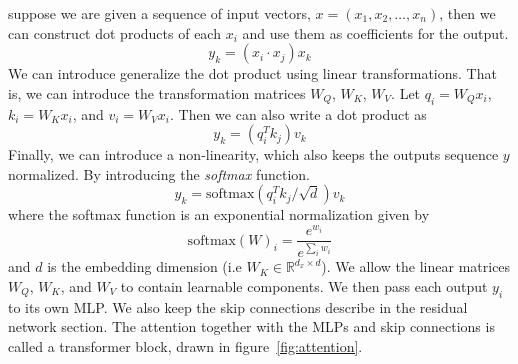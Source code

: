 suppose we are given a sequence of input vectors, $x=(x_1,x_2,\ldots,x_n)$, then we can construct dot products of each $x_i$ and use them as coefficients for the output.
\begin{equation}
	y_k = (x_i \cdot x_j)x_k
\end{equation}
We can introduce generalize the dot product using linear transformations. That is, we can introduce the transformation matrices $W_Q$, $W_K$, $W_V$. Let $q_i = W_Q x_i$, $k_i = W_K x_i$, and $v_i = W_V x_i$. Then we can also write a dot product as 
\begin{equation}
	y_k = (q_i^T k_j)v_k
\end{equation}
Finally, we can introduce a non-linearity, which also keeps the outputs sequence $y$ normalized. By introducing the \textit{softmax} function.
\begin{equation}
	y_k = \mathrm{softmax}(q_i^T k_j / \sqrt{d})v_k
\end{equation}
where the softmax function is an exponential normalization given by
\begin{equation}
	\mathrm{softmax}(W)_i = \frac{e^{w_i}}{e^{\sum_i{w_i}}}
\end{equation}
and $d$ is the embedding dimension (i.e $W_K\in \mathbb{R}^{d_x\times d}$).
We allow the linear matrices $W_Q$, $W_K$, and $W_V$ to contain learnable components. We then pass each output $y_i$ to its own MLP. We also keep the skip connections describe in the residual network section. The attention together with the MLPs and skip connections is called a transformer block, drawn in figure~\ref{fig:attention}.
